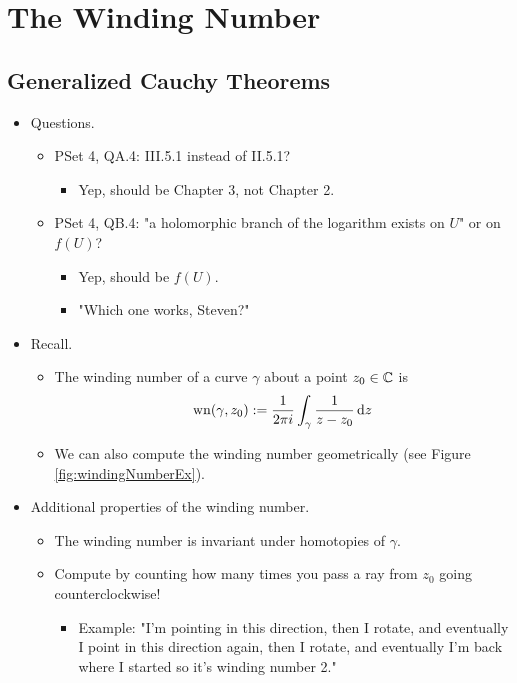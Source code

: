 \documentclass[../notes.tex]{subfiles}
\begin{document}
\chapter{The Winding Number}
\section{Generalized Cauchy Theorems}
\begin{itemize}
    \item {}Questions.
    \begin{itemize}
        \item PSet 4, QA.4: III.5.1 instead of II.5.1?
        \begin{itemize}
            \item Yep, should be Chapter 3, not Chapter 2.
        \end{itemize}
        \item PSet 4, QB.4: "a holomorphic branch of the logarithm exists on $U$" or on $f(U)$?
        \begin{itemize}
            \item Yep, should be $f(U)$.
            \item "Which one works, Steven?"
        \end{itemize}
    \end{itemize}
    \item Recall.
    \begin{itemize}
        \item The winding number of a curve $\gamma$ about a point $z_0\in\mathbb{C}$ is
        \begin{equation*}
            \operatorname{wn}(\gamma,z_0) := \frac{1}{2\pi i}\int_\gamma\frac{1}{z-z_0}\dd{z}
        \end{equation*}
        \item We can also compute the winding number geometrically (see Figure \ref{fig:windingNumberEx}).
    \end{itemize}
    \item Additional properties of the winding number.
    \begin{itemize}
        \item The winding number is invariant under homotopies of $\gamma$.
        \item Compute by counting how many times you pass a ray from $z_0$ going counterclockwise!
        \begin{itemize}
            \item Example: "I'm pointing in this direction, then I rotate, and eventually I point in this direction again, then I rotate, and eventually I'm back where I started so it's winding number 2."

\end{itemize}
\end{itemize}
\end{itemize}
\end{document}
